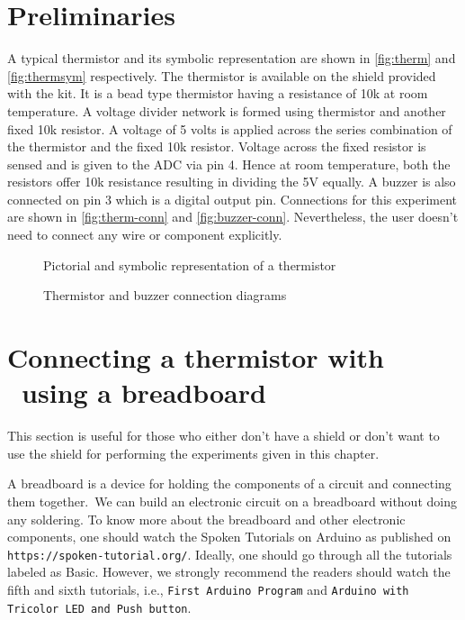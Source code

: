 \section{Preliminaries}
A typical thermistor and its symbolic representation are shown in
\ref{fig:therm} and \ref{fig:thermsym} respectively. The thermistor is
available on the shield provided with the kit.  It is a bead type
thermistor having a resistance of 10k at room temperature. A voltage
divider network is formed using thermistor and another fixed 10k
resistor. A voltage of 5 volts is applied across the series
combination of the thermistor and the fixed 10k resistor. Voltage
across the fixed resistor is sensed and is given to the ADC via pin
4. Hence at room temperature, both the resistors offer 10k resistance
resulting in dividing the 5V equally. A buzzer is also connected on
pin 3 which is a digital output pin.
Connections for this experiment are shown in \ref{fig:therm-conn}
and \ref{fig:buzzer-conn}.  Nevertheless, the user doesn't need to
connect any wire or component explicitly.


\begin{figure}
  \centering
   \hfill
  \caption{Pictorial and symbolic representation of a thermistor}
\end{figure}


\begin{figure}
  \centering
   \hfill
  \caption{Thermistor and buzzer connection diagrams}
\end{figure}

\section{Connecting a thermistor with \arduino\ using a breadboard}
This section is useful for those who either don't have a shield or don't want to use the shield
for performing the experiments given in this chapter.

A breadboard is a device for holding the components of a circuit and connecting
them together. We can build an electronic circuit on a breadboard without doing any
soldering. To know more about the breadboard and other electronic components,
one should watch the Spoken Tutorials on Arduino as published on
  {\tt https://spoken-tutorial.org/}. Ideally, one should go through all the
tutorials labeled as Basic. However, we strongly recommend the readers should
watch the fifth and sixth tutorials, i.e., {\tt First Arduino Program} and
  {\tt Arduino with Tricolor LED and Push button}.

